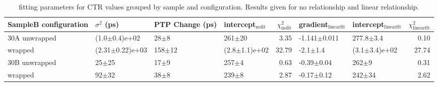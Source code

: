 \begin{table}
\caption{\label{tab:ctrfitresults} fitting parameters for CTR values grouped by sample and configuration. Results given for no relationship and linear relationship.}
\begin{tabular}{llllrllr}
\hline
SampleB configuration &$\sigma^2$ (ps) & PTP Change (ps) & intercept$_\text{nofit}$ &  $\chi^2_\text{nofit}$ & gradient$_\text{linearfit}$ & intercept$_\text{linearfit}$ &  $\chi^2_\text{linearfit}$ \\
\hline
30A     unwrapped     &    (1.0$\pm$0.4)e+02 &    28$\pm$8 &         261$\pm$20 &                   3.35 &    -1.141$\pm$0.011 &      277.8$\pm$3.4 &                    0.10 \\
        wrapped       &  (2.31$\pm$0.22)e+03 &  158$\pm$12 &  (2.8$\pm$1.1)e+02 &                  32.79 &        -2.1$\pm$1.4 &  (3.1$\pm$3.4)e+02 &                   27.74 \\
30B     unwrapped     &            25$\pm$25 &    17$\pm$9 &          257$\pm$4 &                   0.63 &      -0.39$\pm$0.04 &          262$\pm$9 &                    0.31 \\
        wrapped       &            92$\pm$32 &    38$\pm$8 &          239$\pm$8 &                   2.87 &      -0.17$\pm$0.12 &         242$\pm$34 &                    2.62 \\
\end{tabular}
\end{table}